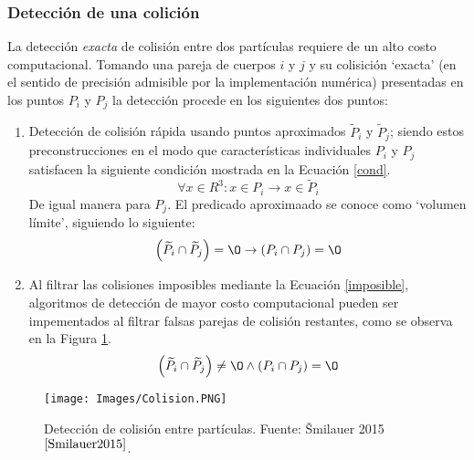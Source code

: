 \subsubsection{Detecci\'on de una colici\'on} \label{detect}

\noindent
\justify

La detecci\'on \textit{exacta} de colisi\'on entre dos part\'iculas requiere de un alto costo computacional. Tomando una pareja de cuerpos $i$ y $j$ y su colisici\'on `exacta' (en el sentido de precisi\'on admisible por la implementaci\'on num\'erica) presentadas en los puntos $P_i$ y $P_j$ la detecci\'on procede en los siguientes dos puntos:

\begin{enumerate}
	\item Detecci\'on de colisi\'on r\'apida usando puntos aproximados $\widetilde{P}_i$ y $\widetilde{P}_j$; siendo estos preconstrucciones en el modo que caracter\'isticas individuales $P_i$ y $P_j$ satisfacen la siguiente condici\'on mostrada en la Ecuaci\'on \ref{cond}.
	\begin{equation}
		\forall x \in R^3 : x \in P_i \rightarrow x \in \widetilde{P}_i
		\label{cond}
	\end{equation}
	De igual manera para $P_j$. El predicado aproximaado se conoce como `volumen l\'imite', siguiendo lo siguiente:
	\begin{equation}
		\left(\widetilde{P}_i \cap \widetilde{P}_j \right) = {\O} \rightarrow \left( P_i \cap P_j \right) = {\O}
		\label{imposible}
	\end{equation}
	\item Al filtrar las colisiones imposibles mediante la Ecuaci\'on \ref{imposible}, algoritmos de detecci\'on de mayor costo computacional pueden ser impementados al filtrar falsas parejas de colisi\'on restantes, como se observa en la Figura \ref{colision}.
	\begin{equation}
		\left(\widetilde{P}_i \cap \widetilde{P}_j \right) \neq {\O} \wedge \left(P_i \cap P_j \right) = {\O}
	\end{equation}
\end{enumerate}

\begin{figure}[h!]
\centering
\texttt{[image: Images/Colision.PNG]}
\caption{Detecci\'on de colisi\'on entre part\'iculas. Fuente: \v Smilauer 2015$^{\cite{Smilauer2015}}$.}
\label{colision}
\end{figure}

\noindent
\justify

